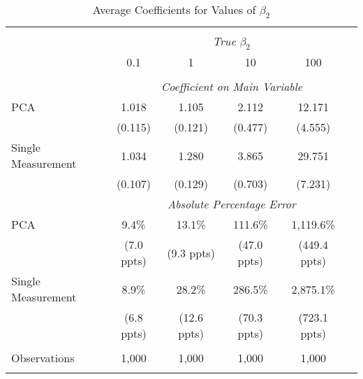 \begin{table}[!htbp] \centering
  \caption{Average Coefficients for Values of $\beta_2$ \label{sim_beta2_2}}
\begin{tabular}{@{\extracolsep{5pt}}lccccc}
\\[-1.8ex]\hline
\hline \\[-1.8ex]
& \multicolumn{5}{c}{\textit{True $\beta_2$}} \
\cr 
\\[-1.8ex] & 0.1 & 1 & 10 & 100 \\
\hline \\[-1.8ex]
& \multicolumn{5}{c}{\textit{Coefficient on Main Variable}} \\
 PCA & 1.018 & 1.105 & 2.112 & 12.171  \\
  & (0.115) & (0.121) & (0.477) & (4.555)\\
  Single Measurement & 1.034 & 1.280 & 3.865 & 29.751  \\
  & (0.107) & (0.129) & (0.703) & (7.231)\\
& \multicolumn{5}{c}{\textit{Absolute Percentage Error}} \\
  PCA & 9.4\% & 13.1\% & 111.6\% & 1,119.6\%  \\
   & (7.0 ppts) & (9.3 ppts) & (47.0 ppts) & (449.4 ppts)\\
  Single Measurement & 8.9\% & 28.2\% & 286.5\% & 2,875.1\%  \\
  & (6.8 ppts) & (12.6 ppts) & (70.3 ppts) & (723.1 ppts)\\
\hline \\[-1.8ex]
 Observations & 1,000 & 1,000 & 1,000 & 1,000 &\\
\hline
\hline \\[-1.8ex]
\end{tabular}
\end{table}